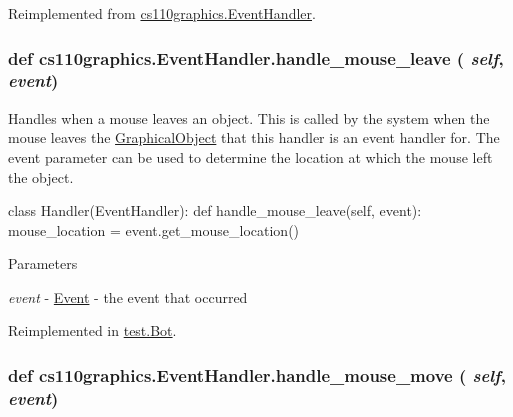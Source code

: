 Reimplemented from \hyperlink{classcs110graphics_1_1EventHandler_a13af3268f8a1aa36b8483eb2deffef15}{cs110graphics.EventHandler}.\hypertarget{classcs110graphics_1_1EventHandler_a5deaf2b6b8055e97ac0ddf6603132c64}{
\subsubsection[{handle\_\-mouse\_\-leave}]{\setlength{\rightskip}{0pt plus 5cm}def cs110graphics.EventHandler.handle\_\-mouse\_\-leave ( {\em self}, \/   {\em event})}}
\label{classcs110graphics_1_1EventHandler_a5deaf2b6b8055e97ac0ddf6603132c64}


Handles when a mouse leaves an object. This is called by the system when the mouse leaves the \hyperlink{classcs110graphics_1_1GraphicalObject}{GraphicalObject} that this handler is an event handler for. The event parameter can be used to determine the location at which the mouse left the object. 
\begin{DoxyCode}
 class Handler(EventHandler):
     def handle_mouse_leave(self, event):
         mouse_location = event.get_mouse_location()
\end{DoxyCode}
 
\begin{DoxyParams}{Parameters}
\item[{\em event}]-\/ \hyperlink{classcs110graphics_1_1Event}{Event} -\/ the event that occurred \end{DoxyParams}


Reimplemented in \hyperlink{classtest_1_1Bot_a2b65e6ecaba1afb4f117b74a684b4387}{test.Bot}.\hypertarget{classcs110graphics_1_1EventHandler_a521fdcd170d15c0b8baa124c78b6d1ef}{
\subsubsection[{handle\_\-mouse\_\-move}]{\setlength{\rightskip}{0pt plus 5cm}def cs110graphics.EventHandler.handle\_\-mouse\_\-move ( {\em self}, \/   {\em event})}}
\label{classcs110graphics_1_1EventHandler_a521fdcd170d15c0b8baa124c78b6d1ef}


